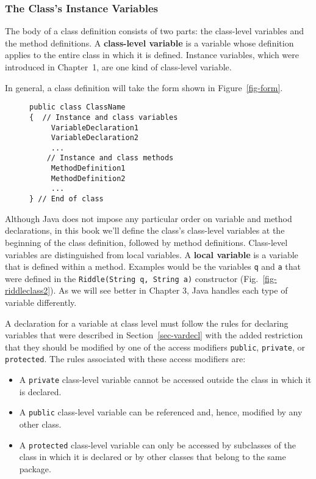 \subsubsection*{The Class's Instance Variables}

\noindent The body of a class definition consists of
two parts: the class-level variables and the method definitions.  A
{\bf class-level variable} is a variable whose definition applies
to the entire class in which it is defined. Instance variables,
which were introduced in Chapter~1, are one kind of class-level
variable.

In general, a class definition will take the form shown in
Figure~\ref{fig-form}.
\begin{figure}[h!]
\jjjprogstart
\begin{jjjlisting}
\begin{lstlisting}
public class ClassName
{  // Instance and class variables
     VariableDeclaration1
     VariableDeclaration2
     ...
    // Instance and class methods
     MethodDefinition1
     MethodDefinition2
     ...
} // End of class
\end{lstlisting}
\end{jjjlisting}
\end{figure}


Although Java does not impose any particular order on variable and
method declarations, in this book we'll define the class's class-level
variables at the beginning of the class definition, followed by method
definitions. Class-level variables are distinguished from
local variables. A {\bf local variable} is a variable that is defined
within a method.  Examples would be the variables {\tt q} and {\tt a}
that were defined in the {\tt Riddle(String q, String a)} constructor
(Fig.~\ref{fig-riddleclass2}).  As we will see better in Chapter 3,
Java handles each type of variable differently.

A declaration for a variable at class level must follow the rules for
declaring variables that were described in Section~\ref{sec-vardecl}
with the added restriction that they should be modified by one of the
access modifiers {\tt public}, {\tt private}, or {\tt protected}.  The
rules associated with these access modifiers are:

\begin{itemize}

\item A {\tt private} class-level variable cannot be accessed outside 
the class in which it is declared.

\item A {\tt public} class-level variable can be referenced and, hence, 
modified by any other class.

\item A {\tt protected} class-level variable can only be accessed 
by subclasses of the class in which it is declared or by other classes
that belong to the same package.

\end{itemize}

